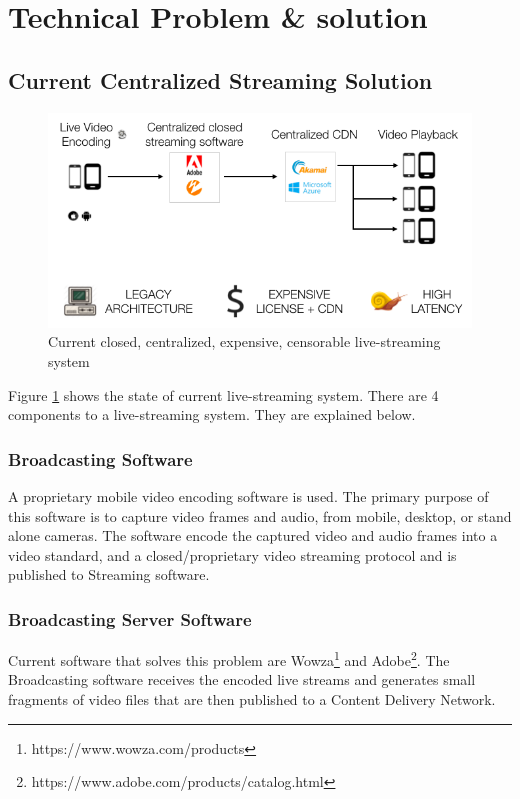 \documentclass{article}
\begin{document}
\section{Technical Problem \& solution}


\subsection{Current Centralized Streaming Solution}

\begin{figure}[h!]
  \centering
  \includegraphics[width=1.0\textwidth]{static/problem-architecture}
  \caption{Current closed, centralized, expensive, censorable live-streaming system}
  \label{image:problem-architecture}
\end{figure}

Figure \ref{image:problem-architecture} shows the state of current live-streaming system. There are 4 components to a live-streaming system. They are explained below.
\subsubsection{Broadcasting Software}
A proprietary mobile video encoding software is used. The primary purpose of this software is to capture video frames and audio, from mobile, desktop, or stand alone cameras. The software encode the captured video and audio frames into a video standard, and a closed/proprietary video streaming protocol and is published to Streaming software.

\subsubsection{Broadcasting Server Software}
Current software that solves this problem are Wowza\footnote{https://www.wowza.com/products} and Adobe\footnote{https://www.adobe.com/products/catalog.html}. The Broadcasting software receives the encoded live streams and generates small fragments of video files that are then published to a Content Delivery Network.
\end{document}
